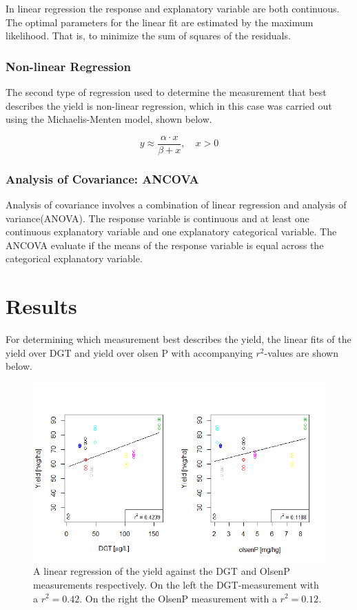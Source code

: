 \documentclass[11pt, fleqn, titlepage]{article}
\begin{document}
\noindent
In linear regression the response and explanatory variable are both continuous. The optimal parameters for the linear fit are estimated by the maximum likelihood. That is, to minimize the sum of squares of the residuals. 

\subsubsection*{Non-linear Regression}
The second type of regression used to determine the measurement that best describes the yield is non-linear regression, which in this case was carried out using the Michaelis-Menten model, shown below.

\[y \approx \frac{\alpha \cdot x}{\beta + x}, \quad x > 0 \]


\subsubsection*{Analysis of Covariance: ANCOVA}
Analysis of covariance involves a combination of linear regression and analysis of variance(ANOVA). The response variable is continuous and at least one continuous explanatory variable and one explanatory categorical variable. The ANCOVA evaluate if the means of the response variable is equal across the categorical explanatory variable.  \cite{statbog} 


\section{Results}

For determining which measurement best describes the yield, the linear fits of the yield over DGT and yield over olsen P with accompanying $r^2$-values are shown below.

\begin{figure}[H]
	\centering
	\includegraphics[width=0.7\linewidth]{billeder/Linearfit.png}
	\caption{A linear regression of the yield against the DGT and OlsenP measurements respectively. On the left the DGT-measurement with a $ r^2 = 0.42 $. On the right the OlsenP measurement with a $ r^2 = 0.12 $.}
	\label{fig:linearfit}
\end{figure}
\end{document}

